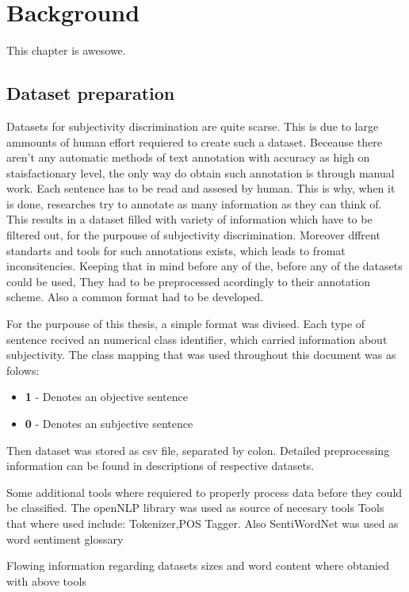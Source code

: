 \chapter{Background}

This chapter is awesowe. \cite{remus2015}

\section{ Dataset preparation }

Datasets for subjectivity discrimination are quite scarse. This is due to large ammounts of human effort requiered to create such a dataset. 
Beceause there aren't any automatic methods of text annotation with accuracy as high on staisfactionary level, the only way do obtain such annotation
is through manual work. Each sentence has to be read and assesed by human. This is why, when it is done, researches try to annotate as many information
as they can think of. 
This results in a dataset filled with variety of information which have to be filtered out, for the purpouse of subjectivity discrimination. Moreover dffrent
standarts and tools for such annotations exists, which leads to fromat inconsitencies.
Keeping that in mind before any of the, before any of the datasets could be used, They had to be preprocessed acordingly to their annotation scheme. Also
a common format had to be developed.

For the purpouse of this thesis, a simple format was divised. Each type of sentence recived an numerical class identifier, 
which carried information about subjectivity. The class mapping that was used throughout this document was as folows:

\begin{itemize}
\item \textbf{1} - Denotes an objective sentence
\item \textbf{0} - Denotes an subjective sentence
\end{itemize} 

Then dataset was stored as csv file, separated by colon. Detailed preprocessing information can be found in descriptions of respective datasets. 

Some additional tools where requiered to properly process data before they could be classified. The openNLP library was used as source of necesary tools
Tools that where used include: Tokenizer,POS Tagger. Also SentiWordNet  was used as word sentiment glossary

Flowing information regarding datasets sizes and word content where obtanied with above tools

